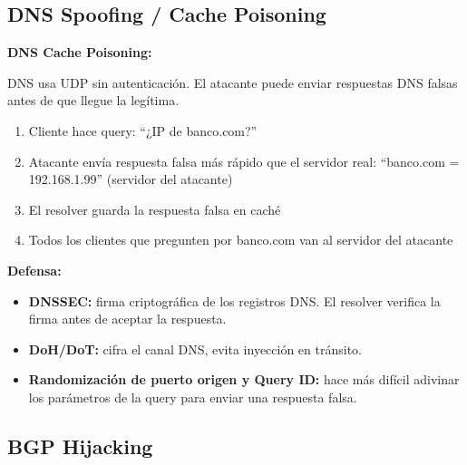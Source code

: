 \subsection{DNS Spoofing / Cache Poisoning}

\begin{cuidado}
\textbf{DNS Cache Poisoning:}

DNS usa UDP sin autenticación. El atacante puede enviar respuestas DNS
falsas antes de que llegue la legítima.

\begin{enumerate}
    \item Cliente hace query: ``¿IP de banco.com?''
    \item Atacante envía respuesta falsa más rápido que el servidor real:
          ``banco.com = 192.168.1.99'' (servidor del atacante)
    \item El resolver guarda la respuesta falsa en caché
    \item Todos los clientes que pregunten por banco.com van al servidor del atacante
\end{enumerate}

\textbf{Defensa:}
\begin{itemize}
    \item \textbf{DNSSEC:} firma criptográfica de los registros DNS. El resolver
          verifica la firma antes de aceptar la respuesta.
    \item \textbf{DoH/DoT:} cifra el canal DNS, evita inyección en tránsito.
    \item \textbf{Randomización de puerto origen y Query ID:} hace más difícil
          adivinar los parámetros de la query para enviar una respuesta falsa.
\end{itemize}
\end{cuidado}

\subsection{BGP Hijacking}

